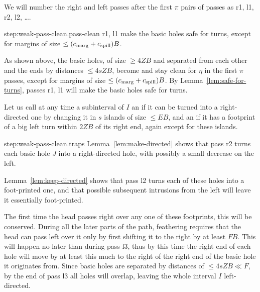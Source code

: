 \documentclass[11pt]{memoir}
\theoremstyle{definition} %
\renewcommand{\le}{\leq}
\renewcommand{\ge}{\geq}
\def\B{B}
\newcommand{\E}{E} %
\newcommand{\F}{F}
\newcommand{\passno}{\pi}
\newcommand{\s}{s} %
\newcommand{\Z}{Z} %
\newcommand{\cns}[1]{c_{\textrm{\upshape #1}}}
\newcommand{\CMarg}{\cns{marg}}
\newcommand{\CSpill}{\cns{spill}}
\begin{document}
\begin{Proof}
We will number the right and left passes after the first \( \passno \) pairs of passes
  as r1, l1, r2, l2, \dots.
  \begin{step+}{step:weak-pass-clean.pass-clean}
    r1, l1 make the basic holes safe for turns, except
    for margins of size \( \le(\CMarg+\CSpill)\B \).
  \end{step+}
  \begin{pproof}
 As shown above, the basic holes, of size \( \ge 4\Z\B \) and
 separated from each other and the ends by distances \( \le 4\s\Z\B \),
 become and stay clean for \( \eta \) in the first \( \passno \) passes, except for margins
 of size \( \le(\CMarg+\CSpill)\B \).
 By Lemma~\ref{lem:safe-for-turns},  passes r1, l1 will make the basic holes safe for turns.
\end{pproof} %

Let us call at any time a subinterval of \( I \) 
an  if it can be turned into a right-directed
one by changing it in \( \s \) islands of size \( \le\E\B \),
and an  if it has a footprint of a big left turn
within \( 2\Z\B \) of its right end, again except for these islands.

\begin{step+}{step:weak-pass-clean.traps}
  Lemma~\ref{lem:make-directed} shows that
  pass r2 turns each basic hole \( J \) into a right-directed hole, with possibly a small
  decrease on the left.

  Lemma~\ref{lem:keep-directed} shows that
  pass l2 turns each of these holes into a foot-printed one, and that possible subsequent intrusions
  from the left will leave it essentially foot-printed.

  The first time the head passes right over any one of these footprints, this will be conserved.
  During all the later parts of the path, feathering requires that the head can pass left over it
  only by first shifting it to the right by at least \( \F\B \).
  This will happen no later than during pass l3, thus by this time the right end of
  each hole will move by at least this much to the right of the right end of the
  basic hole it originates from.
  Since basic holes are separated by distances of \( \le 4\s\Z\B\ll\F \),
  by the end of pass l3 all holes will overlap,
  leaving the whole interval \( I \) left-directed.
  

\end{step+}
\end{Proof}
\end{document}
